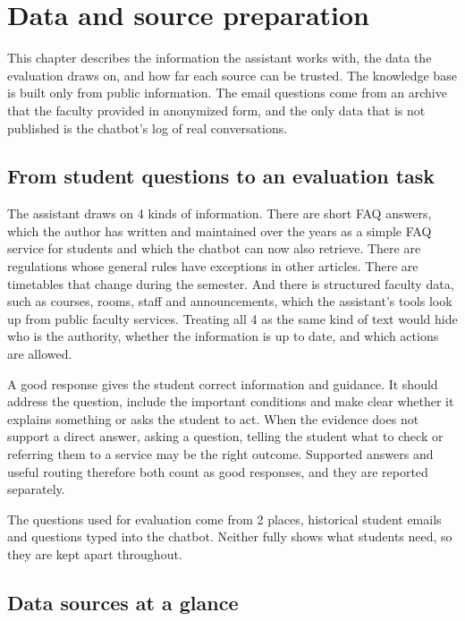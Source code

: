 \section{Data and source preparation}
\label{ch:data}

This chapter describes the information the assistant works with, the data the evaluation draws on, and how far each source can be trusted. The knowledge base is built only from public information. The email questions come from an archive that the faculty provided in anonymized form, and the only data that is not published is the chatbot's log of real conversations.

\subsection{From student questions to an evaluation task}

The assistant draws on 4 kinds of information. There are short FAQ answers, which the author has written and maintained over the years as a simple FAQ service for students and which the chatbot can now also retrieve. There are regulations whose general rules have exceptions in other articles. There are timetables that change during the semester. And there is structured faculty data, such as courses, rooms, staff and announcements, which the assistant's tools look up from public faculty services. Treating all 4 as the same kind of text would hide who is the authority, whether the information is up to date, and which actions are allowed.

A good response gives the student correct information and guidance. It should address the question, include the important conditions and make clear whether it explains something or asks the student to act. When the evidence does not support a direct answer, asking a question, telling the student what to check or referring them to a service may be the right outcome. Supported answers and useful routing therefore both count as good responses, and they are reported separately.

The questions used for evaluation come from 2 places, historical student emails and questions typed into the chatbot. Neither fully shows what students need, so they are kept apart throughout.

\subsection{Data sources at a glance}


